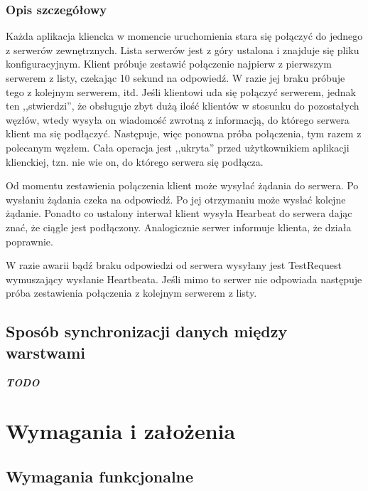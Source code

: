 {\subsubsection*[Opis szczegółowy]{Opis szczegółowy}
\par{Każda aplikacja kliencka w momencie uruchomienia stara się połączyć do jednego z serwerów zewnętrznych. Lista serwerów jest z góry ustalona i znajduje się pliku konfiguracyjnym. Klient próbuje zestawić połączenie najpierw z pierwszym serwerem z listy, czekając 10 sekund na odpowiedź. W razie jej braku próbuje tego z kolejnym serwerem, itd. Jeśli klientowi uda się połączyć serwerem, jednak ten ,,stwierdzi'', że obsługuje zbyt dużą ilość klientów w stosunku do pozostałych węzłów, wtedy wysyła on wiadomość zwrotną z informacją, do którego serwera klient ma się podłączyć. Następuje, więc ponowna próba połączenia, tym razem z polecanym węzłem. Cała operacja jest ,,ukryta'' przed użytkownikiem aplikacji klienckiej, tzn. nie wie on, do którego serwera się podłącza.}

\par{Od momentu zestawienia połączenia klient może wysyłać żądania do serwera. Po wysłaniu żądania czeka na odpowiedź. Po jej otrzymaniu może wysłać kolejne żądanie. Ponadto co ustalony interwał klient wysyła Hearbeat do serwera dając znać, że ciągle jest podłączony. Analogicznie serwer informuje klienta, że działa poprawnie.}

\par{W razie awarii bądź braku odpowiedzi od serwera wysyłany jest TestRequest wymuszający wysłanie Heartbeata. Jeśli mimo to serwer nie odpowiada następuje próba zestawienia połączenia z kolejnym serwerem z listy.}


\subsection[Sposób synchronizacji danych między warstwami]{Sposób synchronizacji danych między warstwami}

\textit{\textbf{TODO}}

\section[Wymagania i założenia]{Wymagania i założenia}

\subsection[Wymagania funkcjonalne]{Wymagania funkcjonalne}

}
